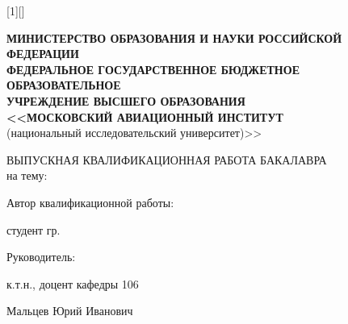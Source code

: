 [1][]
{
\vspace{-9ex}
\begin{center}
\begin{minipage}{0.05\textwidth}
    \resizebox{1.3cm}{!}{}
\end{minipage}
\hfill
\begin{minipage}{0.93\textwidth}
\begin{center}
\tiny{
    \textbf{МИНИСТЕРСТВО ОБРАЗОВАНИЯ И НАУКИ РОССИЙСКОЙ ФЕДЕРАЦИИ}\\
    \textbf{ФЕДЕРАЛЬНОЕ ГОСУДАРСТВЕННОЕ БЮДЖЕТНОЕ ОБРАЗОВАТЕЛЬНОЕ\\
        УЧРЕЖДЕНИЕ ВЫСШЕГО ОБРАЗОВАНИЯ\\
    <<МОСКОВСКИЙ АВИАЦИОННЫЙ ИНСТИТУТ}\\ 
(национальный исследовательский университет)>>}

\end{center}
\end{minipage}
\vspace{5ex}

\footnotesize{ВЫПУСКНАЯ КВАЛИФИКАЦИОННАЯ РАБОТА БАКАЛАВРА\\ на тему:}\par
\small{\inserttitle}\par
\vspace{10ex}
\hfill \scriptsize{Автор квалификационной работы: }\par
\hfill \scriptsize{студент гр.\insertinstitute}\par
\hfill \scriptsize{\insertauthor}\par
\hfill \scriptsize{Руководитель: }\par
\hfill \scriptsize{к.т.н., доцент кафедры 106}\par
\hfill \scriptsize{Мальцев Юрий Иванович}\par


\insertdate\par
{}\inserttitlegraphic
\end{center}
}


